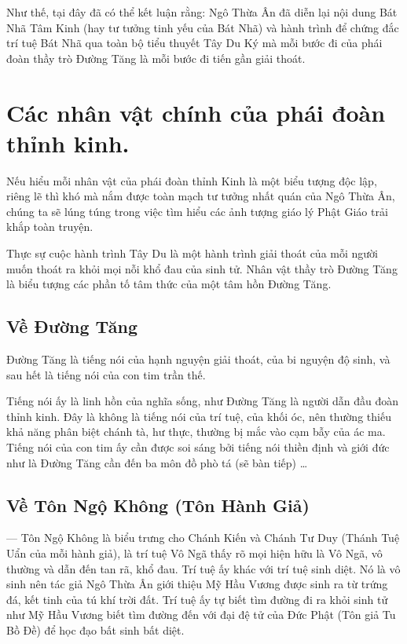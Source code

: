Như thế, tại đây đã có thể kết luận rằng: Ngô Thừa Ân đã diễn lại nội dung Bát Nhã Tâm Kinh (hay tư tưởng tinh yếu của Bát Nhã) và hành trình để chứng đắc trí tuệ Bát Nhã qua toàn bộ tiểu thuyết Tây Du Ký mà mỗi bước đi của phái đoàn thầy trò Đường Tăng là mỗi bước đi tiến gần giải thoát.

\section{Các nhân vật chính của phái đoàn thỉnh kinh.} %
\label{sec:cac_nhan_vat_chinh_cua_phai_doan_thinh_kinh}

Nếu hiểu mỗi nhân vật của phái đoàn thỉnh Kinh là một biểu tượng độc lập, riêng lẽ thì khó mà nắm được toàn mạch tư tưởng nhất quán của Ngô Thừa Ân, chúng ta sẽ lúng túng trong việc tìm hiểu các ảnh tượng giáo lý Phật Giáo trải khắp toàn truyện.

Thực sự cuộc hành trình Tây Du là một hành trình giải thoát của mỗi người muốn thoát ra khỏi mọi nỗi khổ đau của sinh tử. Nhân vật thầy trò Đường Tăng là biểu tượng các phần tố tâm thức của một tâm hồn Đường Tăng.

\subsection{Về Đường Tăng} %
\label{sub:ve_duong_tang}


Đường Tăng là tiếng nói của hạnh nguyện giải thoát, của bi nguyện độ sinh, và sau hết là tiếng nói của con tim trần thế.

Tiếng nói ấy là linh hồn của nghĩa sống, như Đường Tăng là người dẫn đầu đoàn thỉnh kinh. Đây là không là tiếng nói của trí tuệ, của khối óc, nên thường thiếu khả năng phân biệt chánh tà, hư thực, thường bị mắc vào cạm bẫy của ác ma. Tiếng nói của con tim ấy cần được soi sáng bởi tiếng nói thiền định và giới đức như là Đường Tăng cần đến ba môn đồ phò tá (sẽ bàn tiếp) \ldots

\subsection{Về Tôn Ngộ Không (Tôn Hành Giả)} %
\label{sub:ve_ton_ngo_khong}

— Tôn Ngộ Không là biểu trưng cho Chánh Kiến và Chánh Tư Duy (Thánh Tuệ Uẩn của mỗi hành giả), là trí tuệ Vô Ngã thấy rõ mọi hiện hữu là Vô Ngã, vô thường và dẫn đến tan rã, khổ đau. Trí tuệ ấy khác với trí tuệ sinh diệt. Nó là vô sinh nên tác giả Ngô Thừa Ân giới thiệu Mỹ Hầu Vương được sinh ra từ trứng đá, kết tinh của tú khí trời đất. Trí tuệ ấy tự biết tìm đường đi ra khỏi sinh tử như Mỹ Hầu Vương biết tìm đường đến với đại đệ tử của Đức Phật (Tôn giả Tu Bồ Đề) để học đạo bất sinh bất diệt.


